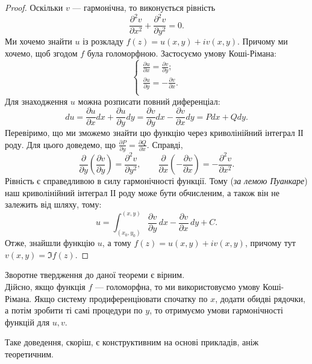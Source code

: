 \documentclass{math_library}
\begin{document}
\begin{proof}
Оскільки $v$ --- гармонічна, то виконується рівність 
\[
\dfrac{\partial^2 v}{\partial x^2} + \dfrac{\partial^2 v}{\partial y^2} = 0.
\]
Ми хочемо знайти $u$ із розкладу $f(z) = u(x,y) + iv(x,y)$. Причому ми хочемо, щоб згодом $f$ була голоморфною. Застосуємо умову Коші-Рімана:\\
\[
	\begin{cases}
		\displaystyle\frac{\partial u}{\partial x} = \frac{\partial v}{\partial y};\\
		\displaystyle\frac{\partial u}{\partial y} = -\frac{\partial v}{\partial x}.\\
	\end{cases}
\]
Для знаходження $u$ можна розписати повний диференціал:
\[
du = \frac{\partial u}{\partial x}dx + \frac{\partial u}{\partial y}dy = \frac{\partial v}{\partial y}dx -\frac{\partial v}{\partial x}dy = Pdx+Qdy.
\]
Перевіримо, що ми зможемо знайти цю функцію через криволінійний інтеграл ІІ роду. Для цього доведемо, що $\displaystyle \frac{\partial P}{\partial y} = \frac{\partial Q}{\partial x}$. Справді, 
\[
\frac{\partial}{\partial y}\left( \frac{\partial v}{\partial y} \right) = \frac{\partial^2 v}{\partial y^2}, \qquad \displaystyle \frac{\partial}{\partial x}\left( -\frac{\partial v}{\partial x} \right) = -\frac{\partial^2 v}{\partial x^2}.
\]
Рівність є справедливою в силу гармонічності функції. Тому (\textit{за лемою Пуанкаре}) наш криволінійний інтеграл ІІ роду може бути обчисленим, а також він не залежить від шляху, тому:
\[
	\displaystyle u = \int_{(x_0, y_0)}^{(x,y)} \frac{\partial v}{\partial y}\,dx -\frac{\partial v}{\partial x}\,dy + C.
\]
	Отже, знайшли функцію $u$, а тому $f(z) = u(x,y) + iv(x,y)$, причому тут $v(x,y) = \Im f(z)$.
\end{proof}
	
\begin{remark}
Зворотне твердження до даної теореми є вірним.
\bigskip \\
Дійсно, якщо функція $f$ --- голоморфна, то ми використовуємо умову Коші-Рімана. Якщо систему продиференціювати спочатку по $x$, додати обидві рядочки, а потім зробити ті самі процедури по $y$, то отримуємо умови гармонічності функцій для $u,v$.
\end{remark}

\begin{remark}
Таке доведення, скоріш, є конструктивним на основі прикладів, аніж теоретичним.
\end{remark}
\end{document}
